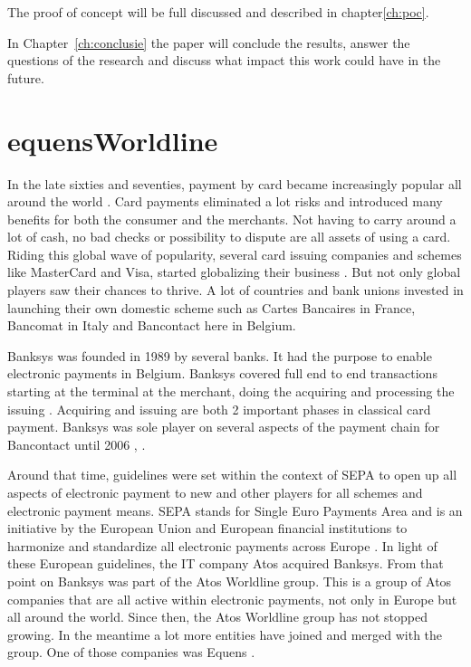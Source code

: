 The proof of concept will be full discussed and described in chapter\ref{ch:poc}.

In Chapter~\ref{ch:conclusie} the paper will conclude the results, answer the questions of the research and discuss what impact this work could have in the future.

\section{equensWorldline}
In the late sixties and seventies, payment by card became increasingly popular
all around the world \autocite{historyMC}. Card payments eliminated a lot risks and introduced many benefits for both the consumer
and the merchants. Not having to carry around a lot of cash, no bad checks or possibility to dispute are all assets
of using a card. Riding this global wave of popularity, several card issuing companies and schemes
like MasterCard and Visa, started globalizing their business \autocite{historyMC}. But not only global players saw their chances to thrive.
A lot of countries and bank unions invested in launching their own domestic scheme such as Cartes Bancaires in France,
Bancomat in Italy and Bancontact here in Belgium. 

Banksys was founded in 1989 by several banks. It had the purpose to enable electronic payments 
in Belgium. Banksys covered full end to end transactions starting at the terminal at the merchant, doing the acquiring and processing
the issuing \autocite{BanksysAtos}. Acquiring and issuing are both 2 important phases in classical card payment. Banksys was sole player on several aspects of the payment chain for
Bancontact until 2006 \autocite{monopoly}, \autocite{intern}. 

Around that time, guidelines were set within the context of SEPA to open up all aspects of electronic payment to
new and other players for all schemes and electronic payment means. SEPA stands for Single Euro Payments Area and is an initiative
by the European Union and European financial institutions to harmonize and standardize all electronic payments across Europe \autocite{SEPA}. In light of these European guidelines, the IT company Atos acquired Banksys. From that point on Banksys was part of the Atos Worldline group.
This is a group of Atos companies that are all active within electronic payments, not only in Europe but all around the world. 
Since then, the Atos Worldline group has not stopped growing. In the meantime a lot more entities have joined and merged with the group.
One of those companies was Equens \autocite{AtosWorldline}. 

